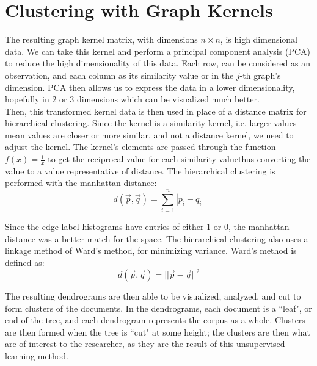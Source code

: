 %
%
%

\section{Clustering with Graph Kernels}

\hspace*{0.3cm} The resulting graph kernel matrix, with dimensions $n \times n$, is high dimensional data. We can take this kernel and perform a principal component analysis (PCA) to reduce the high dimensionality of this data. Each row, can be considered as an observation, and each column as its similarity value or in the $j$-th graph's dimension. PCA then allows us to express the data in a lower dimensionality, hopefully in 2 or 3 dimensions which can be visualized much better. \\

Then, this transformed kernel data is then used in place of a distance matrix for hierarchical clustering. Since the kernel is a similarity kernel, i.e. larger values mean values are closer or more similar, and not a distance kernel, we need to adjust the kernel. The kernel's elements are passed through the function $f(x) = \frac{1}{x}$ to get the reciprocal value for each similarity value\textemdash thus converting the value to a value representative of distance. The hierarchical clustering is performed with the manhattan distance: \\

\begin{equation}
d(\vec{p},\vec{q}) = \sum_{i=1}^n |p_i - q_i|
\end{equation}

Since the edge label histograms have entries of either 1 or 0, the manhattan distance was a better match for the space. The hierarchical clustering also uses a linkage method of Ward's method, for minimizing variance. Ward's method is defined as:\\

\begin{equation}
d(\vec{p},\vec{q}) = || \vec{p} - \vec{q} ||^2
\end{equation}

The resulting dendrograms are then able to be visualized, analyzed, and cut to form clusters of the documents. In the dendrograms, each document is a ``leaf", or end of the tree, and each dendrogram represents the corpus as a whole. Clusters are then formed when the tree is ``cut" at some height; the clusters are then what are of interest to the researcher, as they are the result of this unsupervised learning method. 